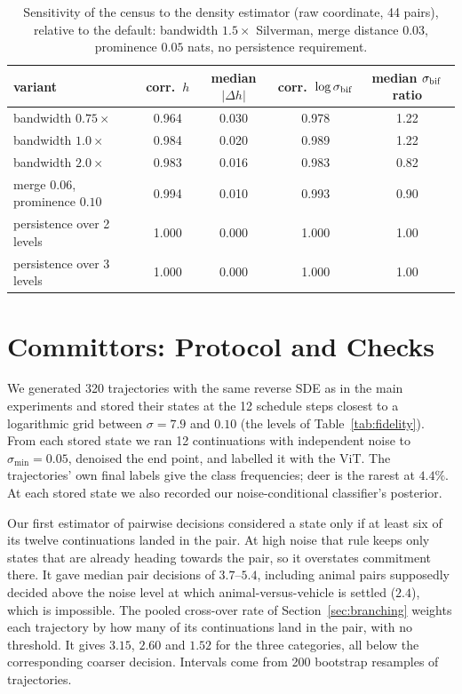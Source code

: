 \begin{table}[h]
\centering
\caption{Sensitivity of the census to the density estimator (raw coordinate, 44 pairs), relative to the default: bandwidth $1.5\times$ Silverman, merge distance $0.03$, prominence $0.05$ nats, no persistence requirement.}
\small
\begin{tabular}{lcccc}
\toprule
variant & corr.\ $h$ & median $|\Delta h|$ & corr.\ $\log\sigma_{\rm bif}$ & median $\sigma_{\rm bif}$ ratio \\
\midrule
bandwidth $0.75\times$ & 0.964 & 0.030 & 0.978 & 1.22 \\
bandwidth $1.0\times$ & 0.984 & 0.020 & 0.989 & 1.22 \\
bandwidth $2.0\times$ & 0.983 & 0.016 & 0.983 & 0.82 \\
merge $0.06$, prominence $0.10$ & 0.994 & 0.010 & 0.993 & 0.90 \\
persistence over 2 levels & 1.000 & 0.000 & 1.000 & 1.00 \\
persistence over 3 levels & 1.000 & 0.000 & 1.000 & 1.00 \\
\bottomrule
\end{tabular}
\end{table}

\section{Committors: Protocol and Checks}
\label{app:committor}

We generated 320 trajectories with the same reverse SDE as in the main experiments and stored their states at the 12 schedule steps closest to a logarithmic grid between $\sigma=7.9$ and $0.10$ (the levels of Table~\ref{tab:fidelity}). From each stored state we ran 12 continuations with independent noise to $\sigma_{\min}=0.05$, denoised the end point, and labelled it with the ViT. The trajectories' own final labels give the class frequencies; deer is the rarest at $4.4\%$. At each stored state we also recorded our noise-conditional classifier's posterior.

Our first estimator of pairwise decisions considered a state only if at least six of its twelve continuations landed in the pair. At high noise that rule keeps only states that are already heading towards the pair, so it overstates commitment there. It gave median pair decisions of $3.7$--$5.4$, including animal pairs supposedly decided above the noise level at which animal-versus-vehicle is settled ($2.4$), which is impossible. The pooled cross-over rate of Section~\ref{sec:branching} weights each trajectory by how many of its continuations land in the pair, with no threshold. It gives $3.15$, $2.60$ and $1.52$ for the three categories, all below the corresponding coarser decision. Intervals come from 200 bootstrap resamples of trajectories.

